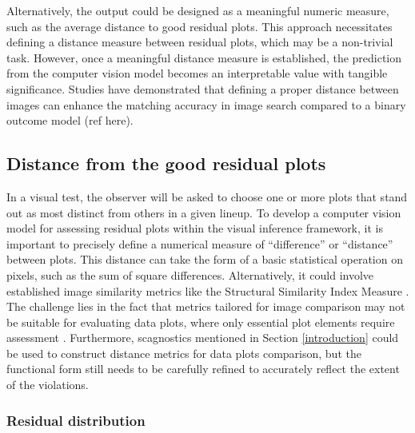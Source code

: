 \documentclass[]{interact}
\theoremstyle{plain}%
\theoremstyle{definition}
\theoremstyle{remark}
\begin{document}
Alternatively, the output could be designed as a meaningful numeric
measure, such as the average distance to good residual plots. This
approach necessitates defining a distance measure between residual
plots, which may be a non-trivial task. However, once a meaningful
distance measure is established, the prediction from the computer vision
model becomes an interpretable value with tangible significance. Studies
have demonstrated that defining a proper distance between images can
enhance the matching accuracy in image search compared to a binary
outcome model (ref here).

\hypertarget{distance-from-the-good-residual-plots}{%
\subsection{Distance from the good residual
plots}\label{distance-from-the-good-residual-plots}}

In a visual test, the observer will be asked to choose one or more plots
that stand out as most distinct from others in a given lineup. To
develop a computer vision model for assessing residual plots within the
visual inference framework, it is important to precisely define a
numerical measure of ``difference'' or ``distance'' between plots. This
distance can take the form of a basic statistical operation on pixels,
such as the sum of square differences. Alternatively, it could involve
established image similarity metrics like the Structural Similarity
Index Measure \citep{wang2004image}. The challenge lies in the fact that
metrics tailored for image comparison may not be suitable for evaluating
data plots, where only essential plot elements require assessment
\citep{chowdhury2018measuring}. Furthermore, scagnostics mentioned in
Section \ref{introduction} could be used to construct distance metrics
for data plots comparison, but the functional form still needs to be
carefully refined to accurately reflect the extent of the violations.

\hypertarget{residual-distribution}{%
\subsubsection{Residual distribution}\label{residual-distribution}}
\end{document}
